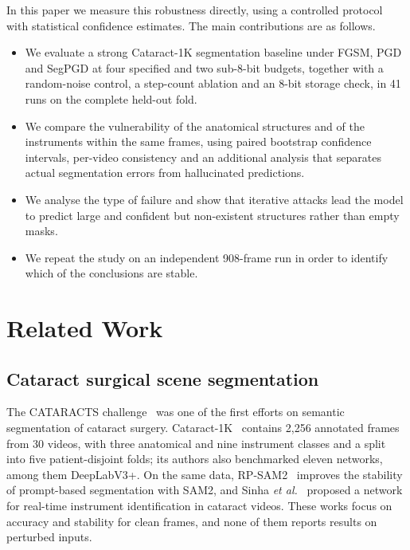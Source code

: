\documentclass[conference]{IEEEtran}
\begin{document}
In this paper we measure this robustness directly, using a controlled protocol with statistical confidence estimates. The main contributions are as follows.
\begin{itemize}
\item We evaluate a strong Cataract-1K segmentation baseline under FGSM, PGD and SegPGD at four specified and two sub-8-bit budgets, together with a random-noise control, a step-count ablation and an 8-bit storage check, in 41 runs on the complete held-out fold.
\item We compare the vulnerability of the anatomical structures and of the instruments within the same frames, using paired bootstrap confidence intervals, per-video consistency and an additional analysis that separates actual segmentation errors from hallucinated predictions.
\item We analyse the type of failure and show that iterative attacks lead the model to predict large and confident but non-existent structures rather than empty masks.
\item We repeat the study on an independent 908-frame run in order to identify which of the conclusions are stable.
\end{itemize}

\section{Related Work}

\subsection{Cataract surgical scene segmentation}
The CATARACTS challenge~\cite{luengo2021cataracts} was one of the first efforts on semantic segmentation of cataract surgery. Cataract-1K~\cite{ghamsarian2024cataract} contains 2,256 annotated frames from 30 videos, with three anatomical and nine instrument classes and a split into five patient-disjoint folds; its authors also benchmarked eleven networks, among them DeepLabV3+. On the same data, RP-SAM2~\cite{zhaksylyk2025rpsam2} improves the stability of prompt-based segmentation with SAM2, and Sinha \emph{et al.}~\cite{sinha2025identifying} proposed a network for real-time instrument identification in cataract videos. These works focus on accuracy and stability for clean frames, and none of them reports results on perturbed inputs.
\end{document}
